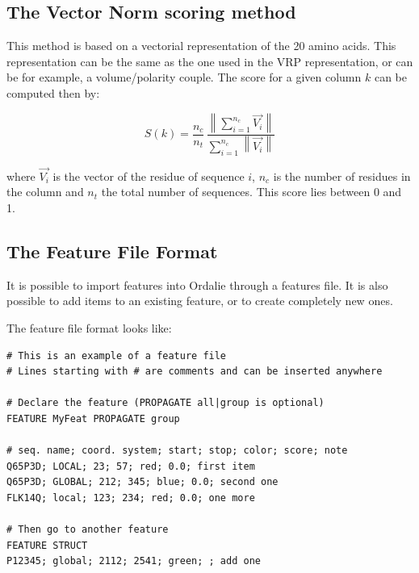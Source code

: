 \documentclass[a4paper]{article}
\begin{document}
\subsection{The Vector Norm scoring method}
\label{meth-vectornorm}
This method is based on a vectorial representation of the 20 amino acids. This representation can be the same as the one used in the VRP representation, or can be for example, a volume/polarity couple. The score for a given column $k$ can be computed then by:

\begin{equation}
  S(k) = \frac{n_c}{n_t}\,
         \frac{\left\| \sum_{i=1}^{n_c} \vec{V_i} \right\|}
              {\sum_{i=1}^{n_c} \left\| \vec{V_i} \right\|}
\end{equation}

where $\vec{V_i}$ is the vector of the residue of sequence $i$, $n_c$ is the number of residues in the column and $n_t$ the total number of sequences. This score lies between 0 and 1.

\subsection{The Feature File Format}
\label{chap-featurefile}
It is possible to import features into Ordalie through a features file. It is also possible to add items to an existing feature, or to create completely new ones.

The feature file format looks like:

\begin{verbatim}
# This is an example of a feature file
# Lines starting with # are comments and can be inserted anywhere

# Declare the feature (PROPAGATE all|group is optional)
FEATURE MyFeat PROPAGATE group

# seq. name; coord. system; start; stop; color; score; note
Q65P3D; LOCAL; 23; 57; red; 0.0; first item
Q65P3D; GLOBAL; 212; 345; blue; 0.0; second one
FLK14Q; local; 123; 234; red; 0.0; one more

# Then go to another feature
FEATURE STRUCT
P12345; global; 2112; 2541; green; ; add one
\end{verbatim}
\end{document}
